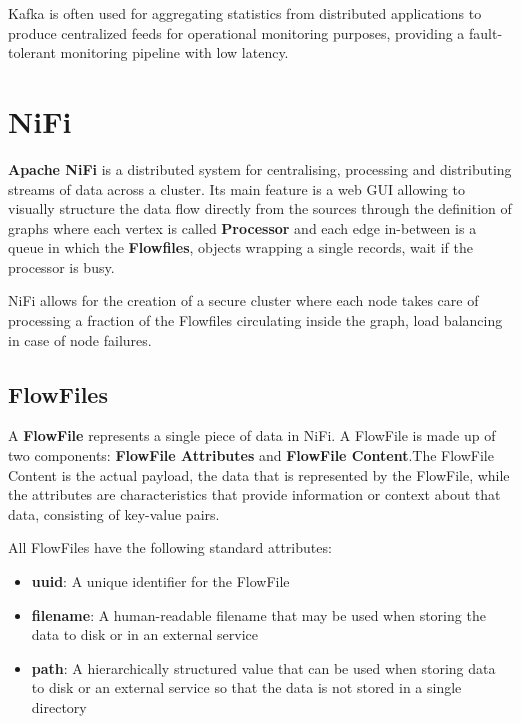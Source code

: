 Kafka is often used for aggregating statistics from distributed applications to produce centralized feeds for operational monitoring purposes, providing a fault-tolerant monitoring pipeline with low latency.


\section{NiFi}

\textbf{Apache NiFi} is a distributed system for centralising, processing and distributing streams of data across a cluster. Its main feature is a web GUI allowing to visually structure the data flow directly from the sources through the definition of graphs where each vertex is called \textbf{Processor} and each edge in-between is a queue in which the \textbf{Flowfiles}, objects wrapping a single records, wait if the processor is busy.

NiFi allows for the creation of a secure cluster where each node takes care of processing a fraction of the Flowfiles circulating inside the graph, load balancing in case of node failures. 

\subsection{FlowFiles}

A \textbf{FlowFile} represents a single piece of data in NiFi. A FlowFile is made up of two components: \textbf{FlowFile Attributes} and \textbf{FlowFile Content}.The FlowFile Content is the actual payload, the data that is represented by the FlowFile, while the attributes are characteristics that provide information or context about that data, consisting of key-value pairs. 

All FlowFiles have the following standard attributes:

\begin{itemize}
    \item \textbf{uuid}: A unique identifier for the FlowFile
    
    \item \textbf{filename}: A human-readable filename that may be used when storing the data to disk or in an external service
    
    \item \textbf{path}: A hierarchically structured value that can be used when storing data to disk or an external service so that the data is not stored in a single directory
\end{itemize}

